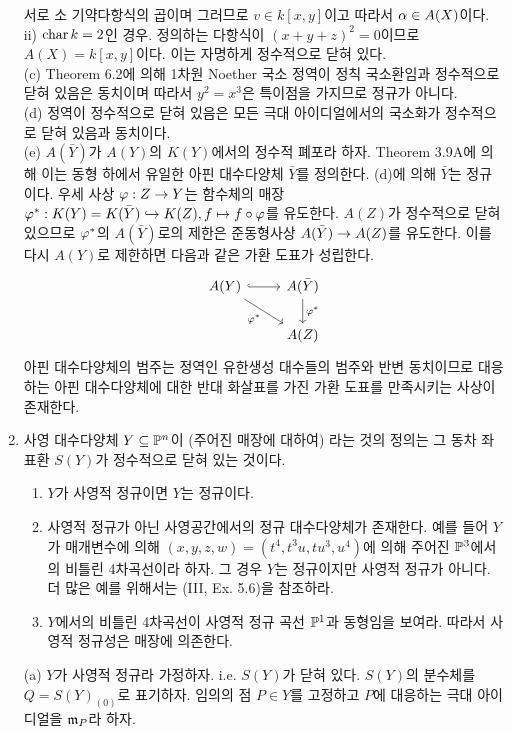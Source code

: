 \begin{enumerate}[label=\tb{3.\arabic*.},itemindent=0mm,itemsep=4mm]
		서로 소 기약다항식의 곱이며 그러므로 $v\in k[x,y]$이고 따라서 $\alpha\in A(X)$이다.
		ii) $\operatorname{char} k=2$인 경우. 정의하는 다항식이 $(x+y+z)^2=0$이므로 $A(X)=k[x,y]$이다. 이는 자명하게 정수적으로 닫혀 있다.\\
		(c) Theorem 6.2에 의해 1차원 Noether 국소 정역이 정칙 국소환임과 정수적으로 닫혀 있음은 동치이며
		따라서 $y^2=x^3$은 특이점을 가지므로 정규가 아니다.\\
		(d) 정역이 정수적으로 닫혀 있음은 모든 극대 아이디얼에서의 국소화가 정수적으로 닫혀 있음과 동치이다.\\
		(e) $A(\bar Y)$가 $A(Y)$의 $K(Y)$에서의 정수적 폐포라 하자.
		Theorem 3.9A에 의해 이는 동형 하에서 유일한 아핀 대수다양체 $\bar Y$를 정의한다. (d)에 의해 $\bar Y$는 정규이다.
		우세 사상 $\varphi:Z\rightarrow Y$는 함수체의 매장 $\varphi^*:K(Y)=K(\bar Y)\hookrightarrow K(Z),f\mapsto f\circ\varphi$를 유도한다.
		$A(Z)$가 정수적으로 닫혀 있으므로 $\varphi^*$의 $A(\bar Y)$로의 제한은 준동형사상 $A(\bar Y)\rightarrow A(Z)$를 유도한다.
		이를 다시 $A(Y)$로 제한하면 다음과 같은 가환 도표가 성립한다.
		$$\begin{tikzcd}A(Y)\arrow[r,hookrightarrow]\arrow[dr,swap,"\ph^*"]&A(\bar Y)\arrow[d,"\ph^*"]\\&A(Z)\end{tikzcd}$$
		아핀 대수다양체의 범주는 정역인 유한생성 대수들의 범주와 반변 동치이므로
		대응하는 아핀 대수다양체에 대한 반대 화살표를 가진 가환 도표를 만족시키는 사상이 존재한다.
		\item {} 사영 대수다양체 $Y\subseteq\mathbb{P}^n$이 (주어진 매장에 대하여)
		라는 것의 정의는 그 동차 좌표환 $S(Y)$가 정수적으로 닫혀 있는 것이다.
		\begin{enumerate}[label=(\alph*)]
		\item $Y$가 사영적 정규이면 $Y$는 정규이다.
		\item 사영적 정규가 아닌 사영공간에서의 정규 대수다양체가 존재한다.
		예를 들어 $Y$가 매개변수에 의해 $(x,y,z,w)=(t^4,t^3u,tu^3,u^4)$에 의해 주어진 $\mathbb{P}^3$에서의 비틀린 4차곡선이라 하자.
		그 경우 $Y$는 정규이지만 사영적 정규가 아니다. 더 많은 예를 위해서는 (III, Ex. 5.6)을 참조하라.
		\item $Y$에서의 비틀린 4차곡선이 사영적 정규 곡선 $\mathbb{P}^1$과 동형임을 보여라. 따라서 사영적 정규성은 매장에 의존한다.
		\end{enumerate}
		\sol (a) $Y$가 사영적 정규라 가정하자. i.e. $S(Y)$가 닫혀 있다. $S(Y)$의 분수체를 $Q=S(Y)_{(0)}$로 표기하자.
		임의의 점 $P\in Y$를 고정하고 $P$에 대응하는 극대 아이디얼을 $\mathfrak{m}_P$라 하자.

\end{enumerate}
